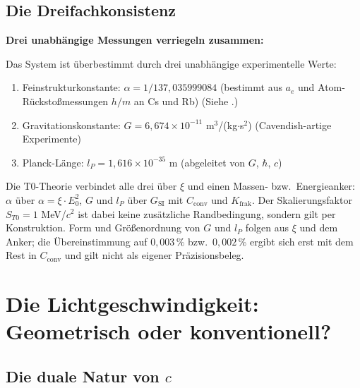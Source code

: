 	\subsection{Die Dreifachkonsistenz}
	
	\begin{insight}
		\textbf{Drei unabhängige Messungen verriegeln zusammen:}
		
		Das System ist überbestimmt durch drei unabhängige experimentelle Werte:
		\begin{enumerate}
			\item Feinstrukturkonstante: $\alpha = 1/137{,}035999084$ (bestimmt aus $a_e$ und Atom-Rückstoßmessungen $h/m$ an Cs und Rb) (Siehe \cite{Feinstrukturkonstante_De}.)
			\item Gravitationskonstante: $G = 6{,}674 \times 10^{-11}$ m$^3$/(kg$\cdot$s$^2$) (Cavendish-artige Experimente)
			\item Planck-Länge: $l_P = 1{,}616 \times 10^{-35}$ m (abgeleitet von $G$, $\hbar$, $c$)
		\end{enumerate}
		
		Die T0-Theorie verbindet alle drei über $\xi$ und einen Massen- bzw.\ Energieanker: $\alpha$ über $\alpha = \xi \cdot E_0^2$, $G$ und $l_P$ über $G_{\text{SI}}$ mit $C_{\text{conv}}$ und $K_{\text{frak}}$. Der Skalierungsfaktor $S_{T0} = 1$ MeV/$c^2$ ist dabei keine zusätzliche Randbedingung, sondern gilt per Konstruktion. Form und Größenordnung von $G$ und $l_P$ folgen aus $\xi$ und dem Anker; die Übereinstimmung auf $0{,}003\,\%$ bzw.\ $0{,}002\,\%$ ergibt sich erst mit dem Rest in $C_{\text{conv}}$ und gilt nicht als eigener Präzisionsbeleg.
	\end{insight}
	
	\section{Die Lichtgeschwindigkeit: Geometrisch oder konventionell?}
	
	\subsection{Die duale Natur von $c$}
	
